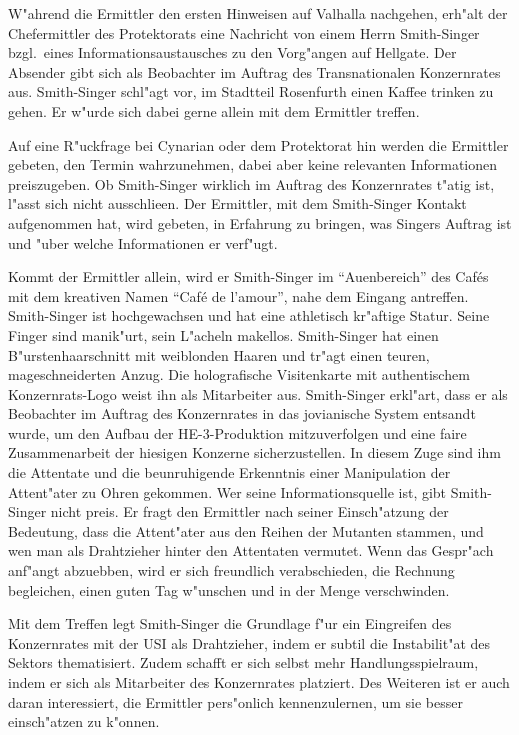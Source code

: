 
W"ahrend die Ermittler den ersten Hinweisen auf Valhalla nachgehen, erh"alt der Chefermittler des Protektorats eine Nachricht von einem Herrn Smith-Singer bzgl.~eines Informationsaustausches zu den Vorg"angen auf Hellgate. Der Absender gibt sich als Beobachter im Auftrag des Transnationalen Konzernrates aus. Smith-Singer schl"agt vor, im Stadtteil Rosenfurth einen Kaffee trinken zu gehen. Er w"urde sich dabei gerne allein mit dem Ermittler treffen.

Auf eine R"uckfrage bei Cynarian oder dem Protektorat hin werden die Ermittler gebeten, den Termin wahrzunehmen, dabei aber keine relevanten Informationen preiszugeben. Ob Smith-Singer wirklich im Auftrag des Konzernrates t"atig ist, l"asst sich nicht ausschlie\3en. Der Ermittler, mit dem Smith-Singer Kontakt aufgenommen hat, wird gebeten, in Erfahrung zu bringen, was Singers Auftrag ist und "uber welche Informationen er verf"ugt.

Kommt der Ermittler allein, wird er Smith-Singer im ``Au\3enbereich'' des Caf\'es mit dem kreativen Namen ``Caf\'e de l'amour'', nahe dem Eingang antreffen. Smith-Singer ist hochgewachsen und hat eine athletisch kr"aftige Statur. Seine Finger sind manik"urt, sein L"acheln makellos. Smith-Singer hat einen B"urstenhaarschnitt mit wei\3blonden Haaren und tr"agt einen teuren, ma\3geschneiderten Anzug. Die holografische Visitenkarte mit authentischem Konzernrats-Logo weist ihn als Mitarbeiter aus. Smith-Singer erkl"art, dass er als Beobachter im Auftrag des Konzernrates in das jovianische System entsandt wurde, um den Aufbau der HE-3-Produktion mitzuverfolgen und eine faire Zusammenarbeit der hiesigen Konzerne sicherzustellen. In diesem Zuge sind ihm die Attentate und die beunruhigende Erkenntnis einer Manipulation der Attent"ater zu Ohren gekommen. Wer seine Informationsquelle ist, gibt Smith-Singer nicht preis. Er fragt den Ermittler nach seiner Einsch"atzung der Bedeutung, dass die Attent"ater aus den Reihen der Mutanten stammen, und wen man als Drahtzieher hinter den Attentaten vermutet. Wenn das Gespr"ach anf"angt abzuebben, wird er sich freundlich verabschieden, die Rechnung begleichen, einen guten Tag w"unschen und in der Menge verschwinden.

Mit dem Treffen legt Smith-Singer die Grundlage f"ur ein Eingreifen des Konzernrates mit der USI als Drahtzieher, indem er subtil die Instabilit"at des Sektors thematisiert. Zudem schafft er sich selbst mehr Handlungsspielraum, indem er sich als Mitarbeiter des Konzernrates platziert. Des Weiteren ist er auch daran interessiert, die Ermittler pers"onlich kennenzulernen, um sie besser einsch"atzen zu k"onnen.

